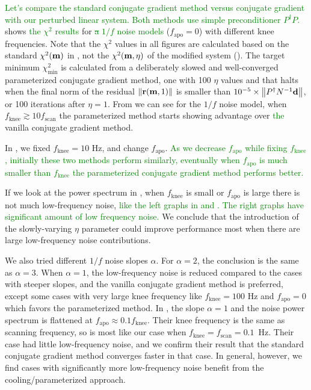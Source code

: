 \documentclass[twocolumn,linenumbers]{aastex631}
\newcommand{\Eq}[1]{\text{Eq.\,\ref{#1}}}
\newcommand{\Figure}[1]{\text{Figure\,\ref{#1}}}
\newcommand{\vbd}{\vb{d}}
\newcommand{\vbm}{\vb{m}}
\newcommand{\Pdagger}{P^{\dagger}}
\newcommand{\textgreen}[1]{\textcolor{green}{#1}}
\begin{document}
\textgreen{
Let's compare the standard conjugate gradient method versus conjugate gradient with our perturbed linear system.
Both methods use simple preconditioner $\Pdagger P$.
}
\Figure{1/f noise chi2} shows \textgreen{the $\chi^2$ results} for \textgreen{\sout{a} $1/f$ noise models} ($f_\text{apo}=0$)  with different knee frequencies.
Note that the $\chi^2$ values in all figures are calculated based on the standard $\chi^2(\vbm)$ in \Eq{chi2 formula},
not the $\chi^2(\vbm, \eta)$ of the modified system (\Eq{chi2 eta formula}).
The target minimum $\chi^2_{\text{min}}$ is calculated from a deliberately slowed and well-converged parameterized conjugate gradient
method, one with 100 $\eta$ values and that halts when the final norm of the residual $\norm{\vb{r}(\vbm,1)}$
is smaller than $10^{-5}\times\norm{\Pdagger N^{-1} \vbd}$, or 100 iterations after $\eta=1$.
From \Figure{1/f noise chi2} we can see for the $1/f$ noise model,
when $f_\text{knee} \gtrsim 10 f_\text{scan}$ the parameterized method starts showing advantage
over \textgreen{the} vanilla conjugate gradient method.


In \Figure{apo noise chi2}, we fixed $f_\text{knee}=10$ Hz, and change $f_\text{apo}$.
\textgreen{
As we decrease $f_\text{apo}$ while fixing $f_\text{knee}$, initially these two methods perform similarly,
eventually when $f_\text{apo}$ is much smaller than $f_\text{knee}$ the parameterized conjugate gradient method
performs better.
}

If we look at the power spectrum in \Figure{power spectrum},
when $f_\text{knee}$ is small or $f_\text{apo}$ is large there is not much low-frequency noise,
\textgreen{
like the left graphs in \Figure{1/f noise chi2} and \Figure{apo noise chi2}.
The right graphs have significant amount of low frequency noise.
}
We conclude that the introduction of the slowly-varying $\eta$ parameter could improve performance most when there are large low-frequency noise contributions.


We also tried different $1/f$ noise slopes $\alpha$. For $\alpha=2$, the conclusion is the
same as $\alpha=3$. When $\alpha=1$, the low-frequency noise is reduced compared to the cases with steeper slopes, and
the vanilla conjugate gradient method is preferred, except some cases with very large
knee frequency like $f_\text{knee} = 100$ Hz and $f_\text{apo}=0$ which favors the
parameterized method.
In \citet{2018A&A...620A..59P}, the slope $\alpha = 1$ and  the noise power spectrum is flattened at $f_\text{apo} \approx 0.1 f_\text{knee}$. Their knee frequency is the same as scanning frequency, so is most like our case when $f_\text{knee}=f_\text{scan}=0.1$~Hz.  Their case had little low-frequency noise, and we confirm their result that the standard conjugate gradient method converges faster in that case.  In general, however, we find cases with significantly more low-frequency noise benefit from the cooling/parameterized approach.
\end{document}
